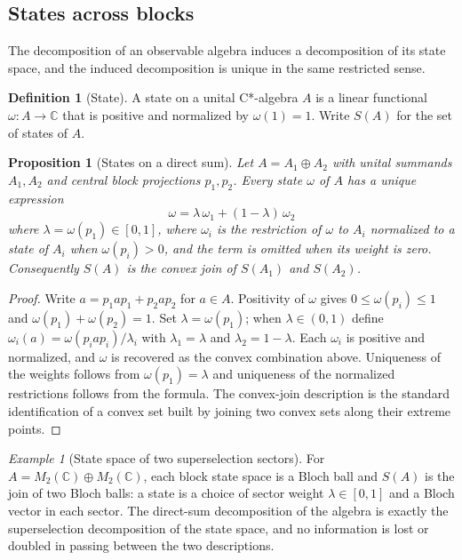 \documentclass[11pt,letterpaper]{article}
\newtheorem{proposition}[theorem]{Proposition}
\theoremstyle{definition}
\newtheorem{definition}[theorem]{Definition}
\theoremstyle{remark}
\newtheorem{example}[theorem]{Example}
\begin{document}
\subsection{States across blocks}

The decomposition of an observable algebra induces a decomposition of its state space, and the induced decomposition is unique in the same restricted sense.

\begin{definition}[State]
A state on a unital C*-algebra $A$ is a linear functional $\omega \colon A \to \mathbb{C}$ that is positive and normalized by $\omega(1) = 1$. Write $S(A)$ for the set of states of $A$.
\end{definition}

\begin{proposition}[States on a direct sum]
\label{prop:states-direct-sum}
Let $A = A_1 \oplus A_2$ with unital summands $A_1, A_2$ and central block projections $p_1, p_2$. Every state $\omega$ of $A$ has a unique expression
\[
\omega = \lambda \, \omega_1 + (1 - \lambda) \, \omega_2
\]
where $\lambda = \omega(p_1) \in [0,1]$, where $\omega_i$ is the restriction of $\omega$ to $A_i$ normalized to a state of $A_i$ when $\omega(p_i) > 0$, and the term is omitted when its weight is zero. Consequently $S(A)$ is the convex join of $S(A_1)$ and $S(A_2)$.
\end{proposition}

\begin{proof}
Write $a = p_1 a p_1 + p_2 a p_2$ for $a \in A$. Positivity of $\omega$ gives $0 \leq \omega(p_i) \leq 1$ and $\omega(p_1) + \omega(p_2) = 1$. Set $\lambda = \omega(p_1)$; when $\lambda \in (0,1)$ define $\omega_i(a) = \omega(p_i a p_i)/\lambda_i$ with $\lambda_1 = \lambda$ and $\lambda_2 = 1 - \lambda$. Each $\omega_i$ is positive and normalized, and $\omega$ is recovered as the convex combination above. Uniqueness of the weights follows from $\omega(p_1) = \lambda$ and uniqueness of the normalized restrictions follows from the formula. The convex-join description is the standard identification of a convex set built by joining two convex sets along their extreme points.
\end{proof}

\begin{example}[State space of two superselection sectors]
For $A = M_2(\mathbb{C}) \oplus M_2(\mathbb{C})$, each block state space is a Bloch ball and $S(A)$ is the join of two Bloch balls: a state is a choice of sector weight $\lambda \in [0,1]$ and a Bloch vector in each sector. The direct-sum decomposition of the algebra is exactly the superselection decomposition of the state space, and no information is lost or doubled in passing between the two descriptions.
\end{example}
\end{document}

